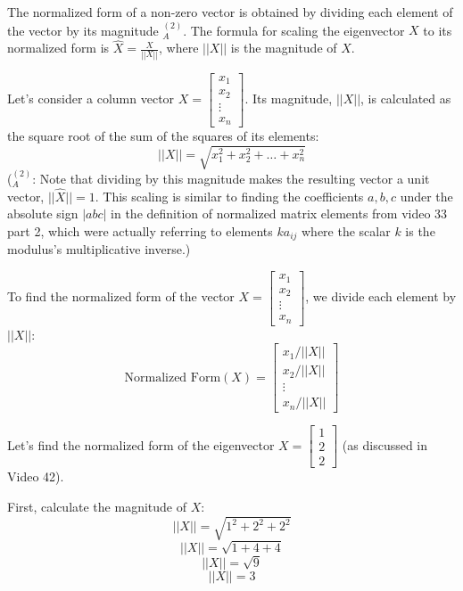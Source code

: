 \documentclass{article}
\begin{document}
The normalized form of a non-zero vector is obtained by dividing each element of the vector by its magnitude $^{(2)}_A$. The formula for scaling the eigenvector $X$ to its normalized form is $\hat{X} = \frac{X}{||X||}$, where $||X||$ is the magnitude of $X$.

Let's consider a column vector $X = \begin{bmatrix} x_1 \\ x_2 \\ \vdots \\ x_n \end{bmatrix}$. Its magnitude, $||X||$, is calculated as the square root of the sum of the squares of its elements:
\[ ||X|| = \sqrt{x_1^2 + x_2^2 + \dots + x_n^2} \]
($^{(2)}_A$: Note that dividing by this magnitude makes the resulting vector a unit vector, $|| \hat{X} || = 1$. This scaling is similar to finding the coefficients $a, b, c$ under the absolute sign $|abc|$ in the definition of normalized matrix elements from video 33 part 2, which were actually referring to elements $k a_ {ij}$ where the scalar $k$ is the modulus's multiplicative inverse.)

To find the normalized form of the vector $X = \begin{bmatrix} x_1 \\ x_2 \\ \vdots \\ x_n \end{bmatrix}$, we divide each element by $||X||$:
\[ \text{Normalized Form} (X) = \begin{bmatrix} x_1 / ||X|| \\ x_2 / ||X|| \\ \vdots \\ x_n / ||X|| \end{bmatrix} \]

Let's find the normalized form of the eigenvector $X = \begin{bmatrix} 1 \\ 2 \\ 2 \end{bmatrix}$ (as discussed in Video 42).

First, calculate the magnitude of $X$:
\[ ||X|| = \sqrt{1^2 + 2^2 + 2^2} \]
\[ ||X|| = \sqrt{1 + 4 + 4} \]
\[ ||X|| = \sqrt{9} \]
\[ ||X|| = 3 \]
\end{document}
